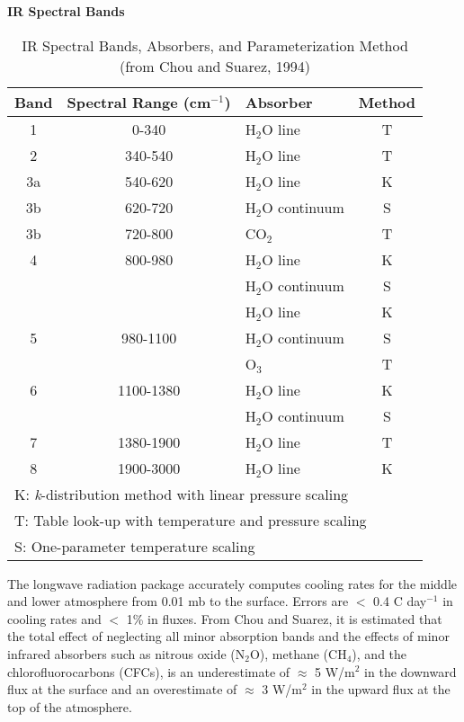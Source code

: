 \begin{table}[htb]
\begin{center}
{\bf IR Spectral Bands} \\
\vspace{0.1in}
\begin{tabular}{|c|c|l|c| } 
\hline
Band & Spectral Range (cm$^{-1}$) & Absorber & Method \\ \hline
\hline
1   & 0-340      & H$_2$O line      & T \\ \hline
2   & 340-540    & H$_2$O line      & T \\ \hline
3a  & 540-620    & H$_2$O line      & K \\ 
3b  & 620-720    & H$_2$O continuum & S \\ 
3b  & 720-800    & CO$_2$           & T \\ \hline 
4   & 800-980    & H$_2$O line      & K \\ 
    &            & H$_2$O continuum & S \\ \hline 
    &            & H$_2$O line      & K \\ 
5   & 980-1100   & H$_2$O continuum & S \\ 
    &            & O$_3$            & T \\ \hline 
6   & 1100-1380  & H$_2$O line      & K \\ 
    &            & H$_2$O continuum & S \\ \hline
7   & 1380-1900  & H$_2$O line      & T \\ \hline 
8   & 1900-3000  & H$_2$O line      & K \\ \hline 
\hline
\multicolumn{4}{|l|}{ \quad K: {\em k}-distribution method with linear pressure scaling } \\
\multicolumn{4}{|l|}{ \quad T: Table look-up with temperature and pressure scaling } \\
\multicolumn{4}{|l|}{ \quad S: One-parameter temperature scaling } \\
\hline
\end{tabular}
\end{center}
\vspace{0.1in}
\caption{IR Spectral Bands, Absorbers, and Parameterization Method (from Chou and Suarez, 1994)}
\label{tab:fizhi:longwave}
\end{table}


The longwave radiation package accurately computes cooling rates for the middle and 
lower atmosphere from 0.01 mb to the surface.  Errors are $<$ 0.4 C day$^{-1}$ in cooling
rates and $<$ 1\% in fluxes.  From Chou and Suarez, it is estimated that the total effect of 
neglecting all minor absorption bands and the effects of minor infrared absorbers such as
nitrous oxide (N$_2$O), methane (CH$_4$), and the chlorofluorocarbons (CFCs), is an underestimate
of $\approx$ 5 W/m$^2$ in the downward flux at the surface and an overestimate of $\approx$ 3 W/m$^2$
in the upward flux at the top of the atmosphere.

